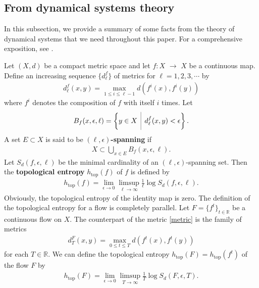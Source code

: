 \documentclass[12pt]{amsart}
\def\bigmid{\ \rule[-3.5mm]{0.1mm}{9mm}\ }
\theoremstyle{definition}
\newcommand{\RR}{{\mathbb R}}
\newcommand{\lr}{{\,\,\longrightarrow\,\,}}
\begin{document}
\vspace{0.3 cm}

\subsection{From dynamical systems theory} 
In this subsection, we provide a summary of some facts from the theory of dynamical systems that we need throughout this paper. For a comprehensive exposition, see \cite{kh, th}.

\vspace{0.2cm}

Let $(X,d)$ be a compact metric space and let $f : X \lr X$ be a continuous map. Define an increasing sequence $\{d_\ell^f\}$ of metrics for $\ell=1,2,3,\cdots$ by
\begin{align}\label{metric}
    d_\ell^f(x,y) = \max_{1 \leq i\leq \ell-1} d(f^i(x),f^i(y))
\end{align}
where $f^i$ denotes the composition of $f$ with itself $i$ times. Let
\begin{align*}
    B_f(x,\epsilon,\ell) = \left\{y \in X \,\bigmid \, d_\ell^f(x,y) < \epsilon \right\}.
\end{align*}
A set $E \subset X$ is said to be \textbf{$(\ell,\epsilon)$-spanning} if 
\begin{align*}
    X \subset \bigcup_{x \in E} B_f(x,\epsilon,\ell).
\end{align*}
Let $S_d(f,\epsilon,\ell)$ be the minimal cardinality of an $(\ell,\epsilon)$-spanning set. Then the \textbf{topological entropy} $h_{\textrm{top}}(f)$ of $f$ is defined by
\begin{align*}
   h_{\textrm{top}}(f) = \lim_{\epsilon \to 0} \limsup_{\ell \to \infty} \frac{1}{\ell} \log S_d(f,\epsilon,\ell).
\end{align*}
Obviously, the topological entropy of the identity map is zero. The definition of the topological entropy for a flow is completely parallel. Let $F=\{f^t\}_{t \in \RR }$ be a continuous flow on $X$. The counterpart of the metric \eqref{metric} is the family of metrics
\begin{align*}
    d_T^{F} (x,y) = \max_{0\leq t \leq T} d(f^t(x),f^t(y))
\end{align*}
for each $T \in \RR$. We can define the topological entropy $h_{\textrm{top}}(F) = h_{\textrm{top}}(f^t)$ of the flow $F$ by
\begin{align*}
    h_{\textrm{top}}(F) = \lim_{\epsilon \to 0} \limsup_{T \to \infty} \frac{1}{T} \log S_d(F,\epsilon,T).
    \end{align*}
\end{document}
